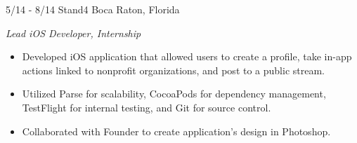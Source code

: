 \documentclass[print]{resume}
\begin{document}
\begin{entrylist}
\entry
{5/14 - 8/14}
{Stand4}
{Boca Raton, Florida}
{
\emph{Lead iOS Developer, Internship}
\begin{itemize}
    \item Developed iOS application that allowed users to create a profile, take in-app actions linked to nonprofit organizations, and post to a public stream.  
    \item Utilized Parse for scalability, CocoaPods for dependency management, TestFlight 
    for internal testing, and Git for source control.
    \item Collaborated with Founder to create application's design in Photoshop.
\end{itemize}
}

\end{entrylist}

\vspace{-10pt} %

\end{document}
